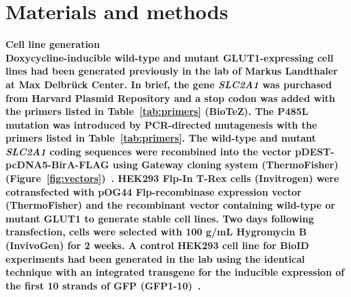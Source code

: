 
\chapter{Materials and methods} %
\label{Chapter2} %

\bfseries{Cell line generation}\\
\normalfont Doxycycline-inducible wild-type and mutant GLUT1-expressing cell lines had been generated previously in the lab of Markus Landthaler at Max Delbr\"{u}ck Center. In brief, the gene \textit{SLC2A1} was purchased from Harvard Plasmid Repository and a stop codon was added with the primers listed in Table~\ref{tab:primers} (BioTeZ). The P485L mutation was introduced by PCR-directed mutagenesis with the primers listed in Table~\ref{tab:primers}. The wild-type and mutant \textit{SLC2A1} coding sequences were recombined into the vector pDEST-pcDNA5-BirA-FLAG using Gateway cloning system (ThermoFisher) (Figure~\ref{fig:vectors})~\cite{Couzens}. HEK293 Flp-In T-Rex cells (Invitrogen) were cotransfected with pOG44 Flp-recombinase expression vector (ThermoFisher) and the recombinant vector containing wild-type or mutant GLUT1 to generate stable cell lines. Two days following transfection, cells were selected with 100 \textmu g/mL Hygromycin B (InvivoGen) for 2 weeks. A control HEK293 cell line for BioID experiments had been generated in the lab using the identical technique with an integrated transgene for the inducible expression of the first 10 strands of GFP (GFP1-10)~\cite{Kamiyama}.

